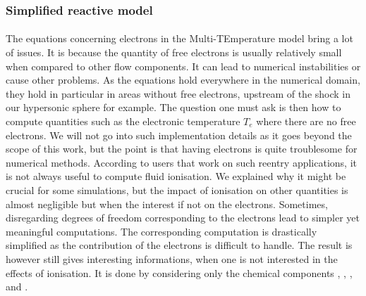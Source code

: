       \subsubsection{Simplified reactive model}

        \paragraph{}
        The equations concerning electrons in the Multi-TEmperature model bring a lot of issues.
        It is because the quantity of free electrons is usually relatively small when compared to other flow components.
        It can lead to numerical instabilities or cause other problems.
        As the equations hold everywhere in the numerical domain, they hold in particular in areas without free electrons, upstream of the shock in our hypersonic sphere for example.
        The question one must ask is then how to compute quantities such as the electronic temperature $T_e$ where there are no free electrons.
        We will not go into such implementation details as it goes beyond the scope of this work, but the point is that having electrons is quite troublesome for numerical methods.
        According to users that work on such reentry applications, it is not always useful to compute fluid ionisation.
        We explained why it might be crucial for some simulations, but the impact of ionisation on other quantities is almost negligible but when the interest if not on the electrons.
        Sometimes, disregarding degrees of freedom corresponding to the electrons lead to simpler yet meaningful computations.
        The corresponding computation is drastically simplified as the contribution of the electrons is difficult to handle.
        The result is however still gives interesting informations, when one is not interested in the effects of ionisation.
        It is done by considering only the chemical components , , ,  and .

